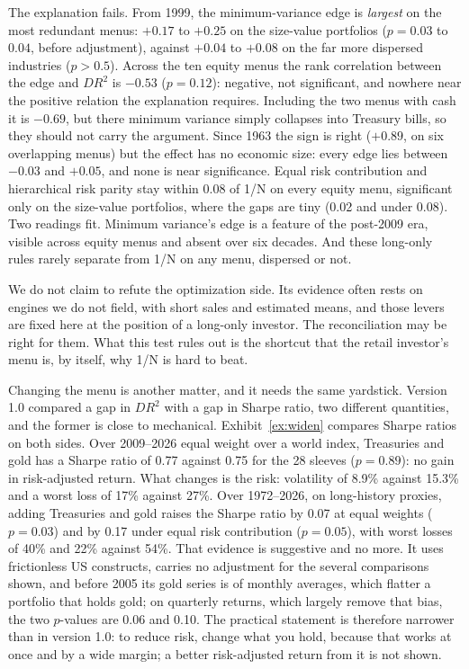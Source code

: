 \documentclass[12pt,letterpaper]{article}
\newenvironment{nuevotexto}{\par\color{nuevoc}}{\par}
\begin{document}
\begin{nuevotexto}
The explanation fails. From 1999, the minimum-variance edge is \emph{largest} on the most redundant menus:
$+0.17$ to $+0.25$ on the size-value portfolios ($p = 0.03$ to $0.04$, before adjustment), against $+0.04$ to
$+0.08$ on the far more dispersed industries ($p > 0.5$). Across the ten equity menus the rank correlation
between the edge and $DR^2$ is $-0.53$ ($p = 0.12$): negative, not significant, and nowhere near the
positive relation the explanation requires. Including the two menus with cash it is $-0.69$, but there
minimum variance simply collapses into Treasury bills, so they should not carry the argument. Since 1963 the sign is right ($+0.89$, on six overlapping menus) but
the effect has no economic size: every edge lies between $-0.03$ and $+0.05$, and none is near
significance. Equal risk contribution and hierarchical risk parity stay within 0.08 of 1/N on every equity
menu, significant only on the size-value portfolios, where the gaps are tiny (0.02 and under 0.08). Two readings fit. Minimum variance's edge is a feature of the post-2009 era, visible across
equity menus and absent over six decades. And these long-only rules rarely separate from 1/N on any menu,
dispersed or not.

We do not claim to refute the optimization side. Its evidence often rests on engines we do not field, with
short sales and estimated means, and those levers are fixed here at the position of a long-only investor.
The reconciliation may be right for them. What this test rules out is the shortcut that the retail
investor's menu is, by itself, why 1/N is hard to beat.

Changing the menu is another matter, and it needs the same yardstick. Version 1.0 compared a gap in $DR^2$
with a gap in Sharpe ratio, two different quantities, and the former is close to mechanical.
Exhibit~\ref{ex:widen} compares Sharpe ratios on both sides. Over 2009--2026 equal weight over a world index,
Treasuries and gold has a Sharpe ratio of 0.77 against 0.75 for the 28 sleeves ($p = 0.89$): no gain in
risk-adjusted return. What changes is the risk: volatility of 8.9\% against 15.3\% and a worst loss of 17\%
against 27\%. Over 1972--2026, on long-history proxies, adding Treasuries and gold raises the Sharpe ratio by
0.07 at equal weights ($p = 0.03$) and by 0.17 under equal risk contribution ($p = 0.05$), with worst losses
of 40\% and 22\% against 54\%. That evidence is suggestive and no more. It uses frictionless US constructs,
carries no adjustment for the several comparisons shown, and before 2005 its gold series is of monthly
averages, which flatter a portfolio that holds gold; on quarterly returns, which largely remove that bias,
the two $p$-values are 0.06 and 0.10. The practical statement is therefore narrower than in version 1.0:
to reduce risk, change what you hold, because that works at once and by a wide margin; a better
risk-adjusted return from it is not shown.
\end{nuevotexto}
\end{document}
